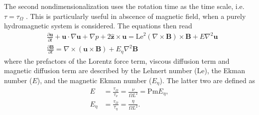 The second nondimensionalization uses the rotation time as the time scale, i.e. $\tau = \tau_\Omega$ \parencite{jackson_plesio-geostrophy_2020}. This is particularly useful in abscence of magnetic field, when a purely hydromagnetic system is considered. The equations then read
\begin{equation}
    \begin{aligned}
        & \frac{\partial \mathbf{u}}{\partial t} + \mathbf{u}\cdot \nabla \mathbf{u} + \nabla p + 2\hat{\mathbf{z}}\times \mathbf{u} = \mathrm{Le}^2 (\nabla\times\mathbf{B})\times \mathbf{B} + E \nabla^2 \mathbf{u} \\ 
        & \frac{\partial \mathbf{B}}{\partial t} = \nabla\times (\mathbf{u}\times \mathbf{B}) + E_\eta \nabla^2 \mathbf{B}
    \end{aligned}
\end{equation}
where the prefactors of the Lorentz force term, viscous diffusion term and magnetic diffusion term are described by the Lehnert number ($\mathrm{Le}$), the Ekman number ($E$), and the magnetic Ekman number ($E_\eta$). The latter two are defined as
\begin{equation}
\begin{aligned}
    E &= \frac{\tau_\Omega}{\tau_\nu} = \frac{\nu}{\Omega L^2} = \mathrm{Pm} E_\eta, \\
    E_\eta &= \frac{\tau_\Omega}{\tau_\eta} = \frac{\eta}{\Omega L^2}.
\end{aligned}
\end{equation}


